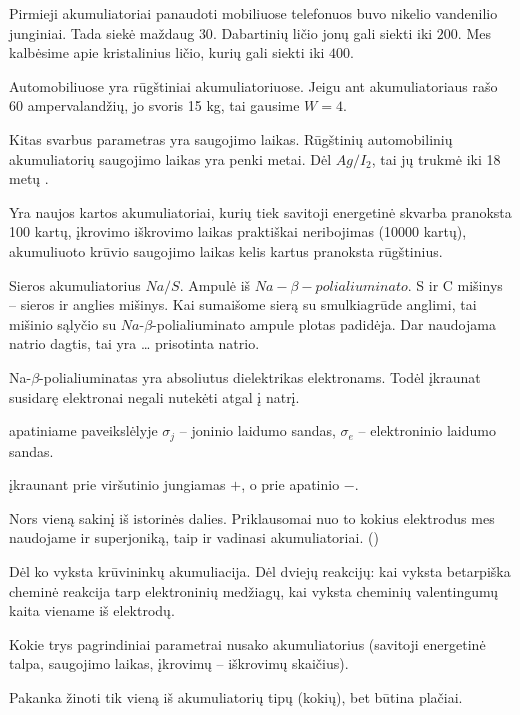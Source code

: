 Pirmieji akumuliatoriai panaudoti mobiliuose telefonuos buvo nikelio
vandenilio junginiai. Tada siekė maždaug $30$. Dabartinių ličio
jonų gali siekti iki $200$. Mes kalbėsime apie kristalinius
ličio, kurių gali siekti iki $400$.

Automobiliuose yra rūgštiniai akumuliatoriuose. Jeigu ant akumuliatoriaus
rašo 60 ampervalandžių, jo svoris 15 kg, tai gausime $W=4$.

Kitas svarbus parametras yra saugojimo laikas. Rūgštinių automobilinių
akumuliatorių saugojimo laikas yra penki metai. Dėl $Ag/I_{2}$, tai
jų trukmė iki 18 metų .

Yra naujos kartos akumuliatoriai, kurių tiek savitoji energetinė
skvarba pranoksta 100 kartų, įkrovimo iškrovimo laikas praktiškai
neribojimas (10000 kartų), akumuliuoto krūvio saugojimo laikas
kelis kartus pranoksta rūgštinius.

Sieros akumuliatorius  $Na/S$. Ampulė iš
$Na-\beta-polialiuminato$. S ir C mišinys – sieros ir anglies mišinys.
Kai sumaišome sierą su smulkiagrūde anglimi, tai mišinio sąlyčio
su $Na$-$\beta$-polialiuminato ampule plotas padidėja.
Dar naudojama natrio dagtis, tai yra … prisotinta natrio.

Na-$\beta$-polialiuminatas yra absoliutus dielektrikas elektronams.
Todėl įkraunat susidarę elektronai negali nutekėti atgal į natrį.

 apatiniame paveikslėlyje $\sigma_{j}$ – joninio laidumo
sandas, $\sigma_{e}$ – elektroninio laidumo sandas.

 įkraunant prie viršutinio jungiamas $+$, o prie apatinio
$-$.

\begin{remember}
  \item Nors vieną sakinį iš istorinės dalies. Priklausomai nuo to
    kokius elektrodus mes naudojame ir superjoniką, taip ir vadinasi
    akumuliatoriai. ()
  \item Dėl ko vyksta krūvininkų akumuliacija. Dėl dviejų reakcijų:
    kai vyksta betarpiška cheminė reakcija tarp elektroninių medžiagų,
    kai vyksta cheminių valentingumų kaita viename iš elektrodų.
  \item Kokie trys pagrindiniai parametrai nusako akumuliatorius
    (savitoji energetinė talpa, saugojimo laikas, įkrovimų – iškrovimų
    skaičius).
  \item Pakanka žinoti tik vieną iš akumuliatorių tipų (kokių),
    bet būtina plačiai.
\end{remember}

